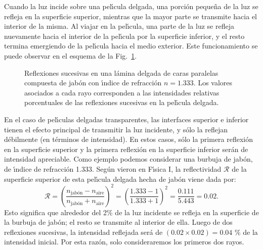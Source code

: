 \documentclass[a4paper]{article}
\begin{document}
Cuando la luz incide sobre una pel\'\i cula delgada, una porci\'on peque\~na 
de la luz se refleja en la superficie superior, mientras que la mayor parte
se transmite hacia el interior de la misma. Al viajar en la pel\'\i cula, 
una parte de la luz se refleja nuevamente hacia el interior de la pel\'\i cula
por la superficie inferior, y el resto termina emergiendo de la pel\'\i cula
hacia el medio exterior. Este funcionamiento se puede observar en el esquema
de la Fig.~\ref{fig:1}. 

\begin{figure}[ht]
    \centering
    \vspace{0.5cm}
    
    \caption{Reflexiones sucesivas en una l\'amina delgada de caras paralelas
        compuesta de jab\'on con \'\i ndice de refracci\'on $n = 1.333$. 
        Los valores asociados a cada rayo corresponden a las intensidades 
        relativas porcentuales de las reflexiones sucesivas 
        en la pel\'\i cula delgada.}
        \label{fig:1}
\end{figure}




En el caso de pel\'\i culas delgadas transparentes, las interfaces superior
e inferior tienen el efecto principal de transmitir la luz incidente, y s\'olo 
la reflejan d\'ebilmente (en t\'erminos de intensidad). En estos casos, s\'olo
la primera reflexi\'on en la superficie superior y la primera reflexi\'on en
la superficie inferior ser\'an de intensidad apreciable. Como ejemplo podemos
considerar una burbuja de jab\'on, de \'\i ndice de refracci\'on 1.333. 
Seg\'un vieron en F\'\i sica I, la reflectividad $\mathcal{R}$ de la superficie superior 
de esta pel\'\i cula delgada hecha de jab\'on viene dada por:
\begin{equation}
    \mathcal{R} = \left( \frac{n_\text{jab\'on}-n_\text{aire}}
    {n_\text{jab\'on}+n_\text{aire}} \right)^2 =  
    \left( \frac{1.333-1}{1.333+1} \right)^2 = \frac{0.111}{5.443} = 0.02 .
\end{equation}
Esto significa que alrededor del 2\% de la luz incidente se refleja en la 
superficie de la burbuja de jab\'on; el resto se transmite al interior de ella.
Luego de dos reflexiones sucesivas, la intensidad reflejada ser\'a de 
$(0.02 \times 0.02) = 0.04$ \% de la intensidad inicial. Por esta raz\'on, 
solo consideraremos los primeros dos rayos. 
\end{document}
